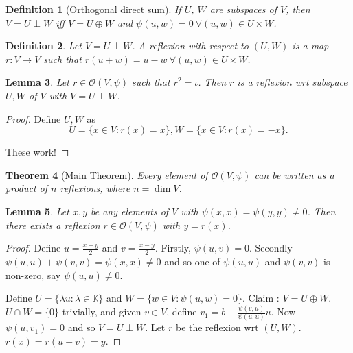 \documentclass{notes}
\theoremstyle{plain}
\newtheorem{theorem}{Theorem}[chapter]
\newtheorem{definition}[theorem]{Definition}
\newtheorem{lemma}[theorem]{Lemma}
\begin{document}
\begin{definition}[Orthogonal direct sum]
  If $U$, $W$ are subspaces of $V$, then $V = U \perp W$ iff $V = U
  \oplus W$ and $\psi(u,w)=0 \: \forall (u,w) \in U \times W$.
\end{definition}

\begin{definition}
  Let $V = U \perp W$.  A reflexion with respect to $(U,W)$ is a map
  $r : V \mapsto V$ such that $r(u+w) = u-w \: \forall (u,w) \in U
  \times W$.
\end{definition}

\begin{lemma}
  Let $r \in \mathcal{O}(V,\psi)$ such that $r^2 = \iota$.  Then $r$
  is a reflexion wrt subspace $U,W$ of $V$ with $V = U \perp W$.
\end{lemma}

\begin{proof}
  Define $U,W$ as
\[
U = \{ x \in V : r(x) = x \}, W = \{ x \in V : r(x) = -x \}.
\]

These work!
\end{proof}

\begin{theorem}[Main Theorem]
  Every element of $\mathcal{O}(V,\psi)$ can be written as a product
  of $n$ reflexions, where $n = \dim V$.
\end{theorem}

\begin{lemma}
  Let $x,y$ be any elements of $V$ with $\psi(x,x) = \psi(y,y) \ne 0$.
  Then there exists a reflexion $r \in \mathcal{O}(V,\psi)$ with $y =
  r(x)$.
\end{lemma}

\begin{proof}
  Define $u = \frac{x+y}{2}$ and $v = \frac{x-y}{2}$.  Firstly,
  $\psi(u,v) = 0$.  Secondly $\psi(u,u) + \psi(v,v) = \psi(x,x) \ne 0$
  and so one of $\psi(u,u)$ and $\psi(v,v)$ is non-zero, say
  $\psi(u,u) \ne 0$.
  
  Define $U = \{ \lambda u : \lambda \in \mathbb{K} \}$ and $W = \{ w
  \in V : \psi(u,w) = 0 \}$.  Claim : $V = U \oplus W$.  $U \cap W =
  \{ 0 \}$ trivially, and given $v \in V$, define $v_1 = b -
  \frac{\psi(v,u)}{\psi(u,u)}u$.  Now $\psi(u,v_1) = 0$ and so $V = U
  \perp W$.  Let $r$ be the reflexion wrt $(U,W)$.  $r(x) = r(u+v) =
  y$.
\end{proof}
\end{document}
